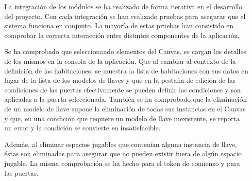 La integración de los módulos se ha realizado de forma iterativa en el desarrollo del proyecto. Con cada integración se han realizado pruebas para asegurar que el sistema funciona en conjunto. La mayoría de estas pruebas han consistido en comprobar la correcta interacción entre distintos componentes de la aplicación.

Se ha comprobado que seleccionando elementos del Canvas, se cargan los detalles de los mismos en la consola de la aplicación. Que al cambiar al contexto de la definición de las habitaciones, se muestra la lista de habitaciones con sus datos en lugar de la lista de los modelos de llaves y que en la pestaña de edición de las condiciones de las puertas efectivamente se pueden definir las condiciones y son aplicadas a la puerta seleccionada.
También se ha comprobado que la eliminación de un modelo de llave supone la eliminación de todas sus instancias en el Canvas y que, en una condición que requiere un modelo de llave inexistente, se reporta un error y la condición se convierte en insatisfacible.

Además, al eliminar espacios jugables que contenían alguna instancia de llave, éstas son eliminadas para asegurar que no pueden existir fuera de algún espacio jugable. La misma comprobación se ha hecho para el token de comienzo y para las puertas.